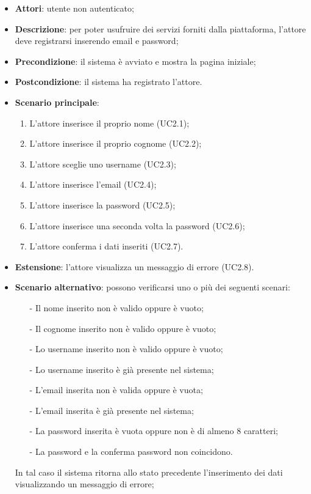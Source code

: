 \begin{itemize}
\item \textbf{Attori}: utente non autenticato;
\item \textbf{Descrizione}: per poter usufruire dei servizi forniti dalla piattaforma, l'attore deve registrarsi inserendo email e password;
\item \textbf{Precondizione}: il sistema è avviato e mostra la pagina iniziale;
\item \textbf{Postcondizione}: il sistema ha registrato l'attore.
\item \textbf{Scenario principale}:
	\begin{enumerate}
	\item L'attore inserisce il proprio nome (UC2.1);
	\item L'attore inserisce il proprio cognome (UC2.2);
	\item L'attore sceglie uno username (UC2.3);
	\item L'attore inserisce l'email (UC2.4);
	\item L'attore inserisce la password (UC2.5);
	\item L'attore inserisce una seconda volta la password (UC2.6);
	\item L'attore conferma i dati inseriti (UC2.7).
	\end{enumerate}
\item \textbf{Estensione}: l'attore visualizza un messaggio di errore (UC2.8).
\item \textbf{Scenario alternativo}: possono verificarsi uno o più dei seguenti scenari:
	\begin{itemize}
	\item[-] Il nome inserito non è valido oppure è vuoto;
	\item[-] Il cognome inserito non è valido oppure è vuoto;
	\item[-] Lo username inserito non è valido oppure è vuoto;
	\item[-] Lo username inserito è già presente nel sistema;
	\item[-] L'email inserita non è valida oppure è vuota;
	\item[-] L'email inserita è già presente nel sistema;
	\item[-] La password inserita è vuota oppure non è di almeno 8 caratteri;
	\item[-] La password e la conferma password non coincidono.
	\end{itemize}
In tal caso il sistema ritorna allo stato precedente l'inserimento dei dati visualizzando un messaggio di errore;
\end{itemize}

